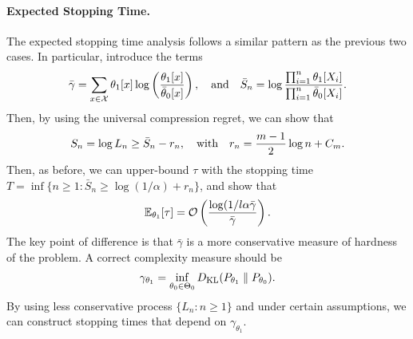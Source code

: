 \documentclass[12pt]{article}
\begin{document}
\paragraph{Expected Stopping Time.} The expected stopping time analysis follows a similar pattern as the previous two cases. In particular, introduce the terms
\begin{align}
    \bar{\gamma} = \sum_{x \in {\cal X}} \theta_1[x] \log \left( \frac{\theta_1[x]}{\bar{\theta}_0[x]} \right), \quad \text{and} \quad \bar{S}_n = \log \frac{\prod_{i=1}^n \theta_1[X_i]}{\prod_{i=1}^n \bar{\theta}_0[X_i]}. 
\end{align}
Then, by using the universal compression regret, we can show that 
\begin{align}
    S_n = \log L_n \geq \bar{S}_n - r_n, \quad \text{with} \quad r_n = \frac{m-1}{2} \log n + C_m. 
\end{align}
Then, as before, we can upper-bound $\tau$ with the stopping time $T = \inf \{n \geq 1: \bar{S}_n \geq \log(1/\alpha) + r_n\}$, and show that 
\begin{align}
    \mathbb{E}_{\theta_1}[\tau] = \mathcal{O} \left( \frac{\log(1/l\alpha \bar{\gamma}}{\bar{\gamma}} \right). 
\end{align}
The key point of difference is that $\bar{\gamma}$ is a more conservative measure of hardness of the problem. A correct complexity measure should be 
\begin{align}
    \gamma_{\theta_1} = \inf_{\theta_0 \in \Theta_0} D_{\text{KL}}(P_{\theta_1} \parallel P_{\theta_0}). 
\end{align}
By using less conservative process $\{L_n: n \geq 1\}$ and under certain assumptions, we can construct stopping times that depend on $\gamma_{\theta_1}$. 
\end{document}
